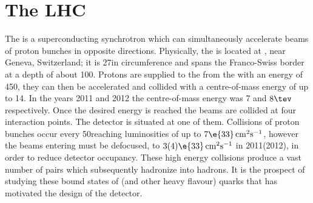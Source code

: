 \section{The LHC}
The \lhc is a superconducting synchrotron which can simultaneously accelerate beams of proton bunches
in opposite directions.
Physically, the \lhc is located at \cern, near Geneva, Switzerland; it is 27\km in
circumference and spans the Franco-Swiss border at a depth of about 100\m.
Protons are supplied to the \lhc from the \sps with an energy of 450\gev, they can then
be accelerated and collided with a centre-of-mass energy of up to 14\tev.
In the years 2011 and 2012 the centre-of-mass energy was 7 and $8\tev$ respectively.
Once the desired energy is reached the beams are collided at four interaction points.
The \lhcb detector is
situated at one of them.
Collisions of proton bunches occur every 50\ns reaching luminosities of up to
$7\e{33}\,\mathrm{cm}^{2}\mathrm{s}^{-1}$, however the beams entering \lhcb must be defocused, to
$3(4)\e{33}\,\mathrm{cm}^{2}\mathrm{s}^{-1}$ in 2011(2012), in order to reduce detector occupancy.
These high energy collisions produce a vast number of \bbbar pairs which subsequently hadronize
into \bquark hadrons.
It is the prospect of studying these bound states of \bquark (and other heavy
flavour) quarks that has motivated the design of the \lhcb detector.


